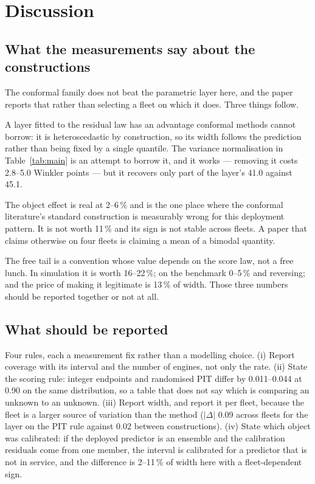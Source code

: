 \documentclass[journal]{IEEEtran}
\begin{document}
\section{Discussion}\label{sec:discussion}

\subsection{What the measurements say about the constructions}

The conformal family does not beat the parametric layer here, and the paper reports that rather
than selecting a fleet on which it does. Three things follow.

A layer fitted to the residual law has an advantage conformal methods cannot borrow: it is
heteroscedastic by construction, so its width follows the prediction rather than being fixed by
a single quantile. The variance normalisation in Table~\ref{tab:main} is an attempt to borrow
it, and it works --- removing it costs 2.8--5.0 Winkler points --- but it recovers only part of
the layer's 41.0 against 45.1.

The object effect is real at 2--6\,\% and is the one place where the conformal literature's
standard construction is measurably wrong for this deployment pattern. It is not worth 11\,\%
and its sign is not stable across fleets. A paper that claims otherwise on four fleets is
claiming a mean of a bimodal quantity.

The free tail is a convention whose value depends on the score law, not a free lunch. In
simulation it is worth 16--22\,\%; on the benchmark 0--5\,\% and reversing; and the price of
making it legitimate is 13\,\% of width. Those three numbers should be reported together or not
at all.

\subsection{What should be reported}

Four rules, each a measurement fix rather than a modelling choice. (i) Report coverage with its
interval and the number of engines, not only the rate. (ii) State the scoring rule: integer
endpoints and randomised PIT differ by 0.011--0.044 at 0.90 on the same distribution, so a
table that does not say which is comparing an unknown to an unknown. (iii) Report width, and
report it per fleet, because the fleet is a larger source of variation than the method
($|\Delta|$ 0.09 across fleets for the layer on the PIT rule against 0.02 between
constructions). (iv) State which object was calibrated: if the deployed predictor is an ensemble
and the calibration residuals come from one member, the interval is calibrated for a predictor
that is not in service, and the difference is 2--11\,\% of width here with a
fleet-dependent sign.
\end{document}
